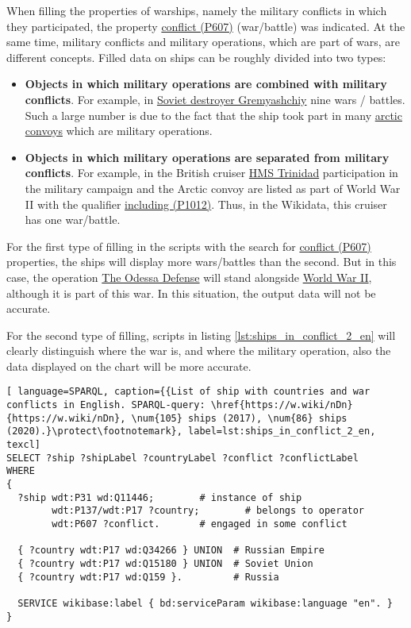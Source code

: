 When filling the properties of warships, namely the military conflicts in which they participated, the property \href{https://www.wikidata.org/wiki/Property:P607}{conflict (P607)} (war/battle) was indicated. At the same time, military conflicts and military operations, which are part of wars, are different concepts. Filled data on ships can be roughly divided into two types:
\begin{itemize}
  \item \textbf{Objects in which military operations are combined with military conflicts}. For example, in \href{https://www.wikidata.org/wiki/Q4148613}{Soviet destroyer Gremyashchiy} nine wars / battles. Such a large number is due to the fact that the ship took part in many \href{https://en.wikipedia.org/wiki/Arctic_convoys_of_World_War_II}{arctic convoys} which are military operations.
  \item \textbf{Objects in which military operations are separated from military conflicts}. For example, in the British cruiser \href{https://en.wikipedia.org/wiki/HMS_Trinidad_(1940)}{HMS Trinidad} participation in the military campaign and the Arctic convoy are listed as part of World War II with the qualifier \href{https://www.wikidata.org/wiki/Property:P1012}{including (P1012)}. Thus, in the Wikidata, this cruiser has one war/battle.
\end{itemize}


For the first type of filling in the scripts with the search for \href{https://www.wikidata.org/wiki/Property:P607}{conflict (P607)} properties, the ships will display more wars/battles than the second. But in this case, the operation \href{https://en.wikipedia.org/wiki/Siege_of_Odessa_(1941)}{The Odessa Defense} will stand alongside \href{https://en.wikipedia.org/wiki/World_War_II}{World War II}, although it is part of this war. In this situation, the output data will not be accurate.

For the second type of filling, scripts in listing \ref{lst:ships_in_conflict_2_en} will clearly distinguish where the war is, and where the military operation, also the data displayed on the chart will be more accurate.

\begin{lstlisting}[ language=SPARQL, caption={{List of ship with countries and war conflicts in English. SPARQL-query: \href{https://w.wiki/nDn}{https://w.wiki/nDn}, \num{105} ships (2017), \num{86} ships (2020).}\protect\footnotemark}, label=lst:ships_in_conflict_2_en, texcl]
SELECT ?ship ?shipLabel ?countryLabel ?conflict ?conflictLabel
WHERE
{
  ?ship wdt:P31 wd:Q11446;        # instance of ship
        wdt:P137/wdt:P17 ?country;        # belongs to operator
        wdt:P607 ?conflict.       # engaged in some conflict
      
  { ?country wdt:P17 wd:Q34266 } UNION  # Russian Empire
  { ?country wdt:P17 wd:Q15180 } UNION  # Soviet Union
  { ?country wdt:P17 wd:Q159 }.         # Russia
      
  SERVICE wikibase:label { bd:serviceParam wikibase:language "en". }
}
\end{lstlisting}


